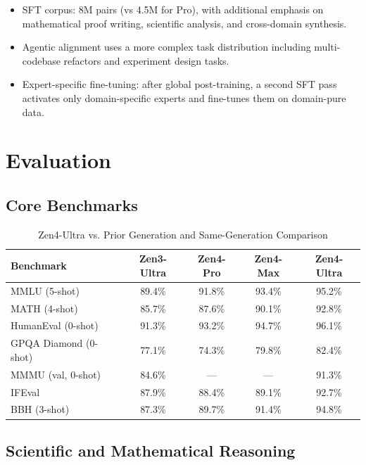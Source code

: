 \documentclass[11pt,a4paper]{article}
\begin{document}
\begin{itemize}
    \item SFT corpus: 8M pairs (vs 4.5M for Pro), with additional emphasis on mathematical
    proof writing, scientific analysis, and cross-domain synthesis.
    \item Agentic alignment uses a more complex task distribution including multi-codebase
    refactors and experiment design tasks.
    \item Expert-specific fine-tuning: after global post-training, a second SFT pass
    activates only domain-specific experts and fine-tunes them on domain-pure data.
\end{itemize}

\section{Evaluation}

\subsection{Core Benchmarks}

\begin{table}[H]
\centering
\begin{tabular}{lcccc}
\toprule
\textbf{Benchmark} & \textbf{Zen3-Ultra} & \textbf{Zen4-Pro} & \textbf{Zen4-Max} & \textbf{Zen4-Ultra} \\
\midrule
MMLU (5-shot)          & 89.4\% & 91.8\% & 93.4\% & 95.2\% \\
MATH (4-shot)          & 85.7\% & 87.6\% & 90.1\% & 92.8\% \\
HumanEval (0-shot)     & 91.3\% & 93.2\% & 94.7\% & 96.1\% \\
GPQA Diamond (0-shot)  & 77.1\% & 74.3\% & 79.8\% & 82.4\% \\
MMMU (val, 0-shot)     & 84.6\% & ---    & ---    & 91.3\% \\
IFEval                 & 87.9\% & 88.4\% & 89.1\% & 92.7\% \\
BBH (3-shot)           & 87.3\% & 89.7\% & 91.4\% & 94.8\% \\
\bottomrule
\end{tabular}
\caption{Zen4-Ultra vs. Prior Generation and Same-Generation Comparison}
\end{table}

\subsection{Scientific and Mathematical Reasoning}
\end{document}
